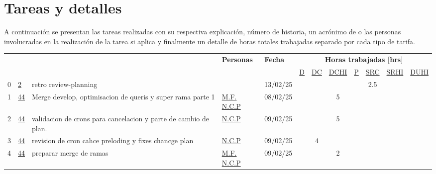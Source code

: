 \documentclass{article}
\begin{document}
\section{Tareas y detalles}
A continuación se presentan las tareas realizadas con su respectiva explicación, número de historia, un acrónimo de o las personas involucradas en la realización de la tarea si aplica y finalmente un detalle de horas totales trabajadas separado por cada tipo de tarifa.

\begin{longtable}{|m{0.3cm}|m{1cm}|p{3cm}|m{1.5cm}|m{1.3cm}||c|c|c|c|c|c|c| |}
        \hline
        \multirow{2}{=}{\centering{\textbf{N°}}} & \multirow{2}{=}{\centering{\textbf{N°Hist}}} & \multirow{2}{=}{\centering{\textbf{Detalle Tarea}}}  & \multirow{2}{=}{\textbf{Personas}} & \multirow{2}{=}{\textbf{Fecha}} &   
        \multicolumn{7}{c||}{
            \textbf{Horas trabajadas [hrs]}
        } \\ 
        \hhline{~~~~~-------}
        &&&&&  \hyperref[D]{\color{blue}D}  
&  \hyperref[DC]{\color{blue}DC}  
&  \hyperref[DCHI]{\color{blue}DCHI}  
&  \hyperref[P]{\color{blue}P}  
&  \hyperref[SRC]{\color{blue}SRC}  
&  \hyperref[SRHI]{\color{blue}SRHI}  
&  \hyperref[DUHI]{\color{blue}DUHI}  
\\ \hline \hline
                 \label{0}0  &  \hyperref[2]{\color{blue}2}  & retro review-planning &  
                 & 13/02/25   &  &  &  &  & 2.5 &  & \\ \hline 

                 \label{1}1  &  \hyperref[44]{\color{blue}44}  & Merge develop, optimisacion de queris y super rama parte 1 &  
                  \hyperref[M.F.]{\color{blue}M.F.} \newline  \hyperref[N.C.P]{\color{blue}N.C.P}  & 08/02/25   &  &  & 5 &  &  &  & \\ \hline 

                 \label{2}2  &  \hyperref[44]{\color{blue}44}  & validacion de crons para cancelacion y parte de cambio de plan. &  
                  \hyperref[N.C.P]{\color{blue}N.C.P}  & 09/02/25   &  &  & 5 &  &  &  & \\ \hline 

                 \label{3}3  &  \hyperref[44]{\color{blue}44}  & revision de cron cahce preloding y fixes chancge plan &  
                  \hyperref[N.C.P]{\color{blue}N.C.P}  & 09/02/25   &  & 4 &  &  &  &  & \\ \hline 

                 \label{4}4  &  \hyperref[44]{\color{blue}44}  & preparar merge de ramas &  
                  \hyperref[M.F.]{\color{blue}M.F.} \newline  \hyperref[N.C.P]{\color{blue}N.C.P}  & 09/02/25   &  &  & 2 &  &  &  & \\ \hline 


\end{longtable}
\end{document}
